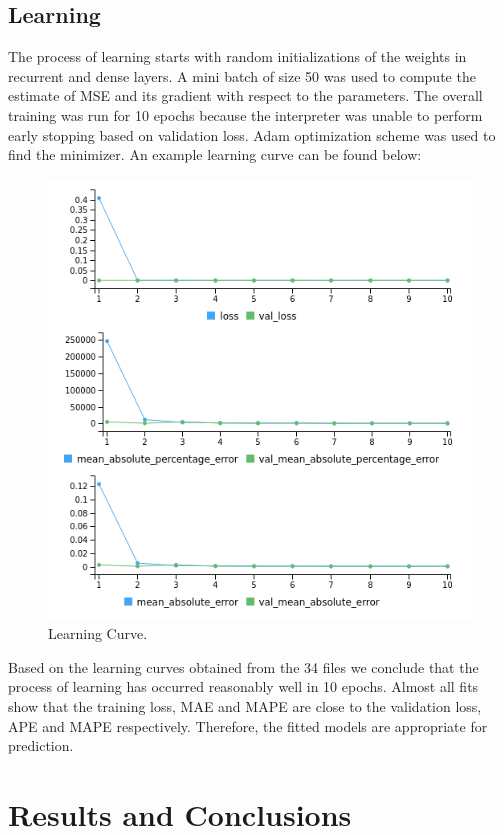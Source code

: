 \documentclass[%
aip,
amsmath,amssymb,
reprint,%
]{revtex4-1}
\begin{document}
\subsection{Learning}

The process of learning starts with random initializations of the weights in recurrent and dense layers. A mini batch of size 50 was used to compute the estimate of MSE and its gradient with respect to the parameters. The overall training was run for 10 epochs because the interpreter was unable to perform early stopping based on validation loss. Adam optimization scheme was used to find the minimizer. An example learning curve can be found below:

\begin{figure}[h!]
	\includegraphics[width=\linewidth]{learning.png}
	\caption{Learning Curve.}
	\label{fig:learning}
\end{figure}

Based on the learning curves obtained from the 34 files we conclude that the process of learning has occurred reasonably well in 10 epochs. Almost all fits show that the training loss, MAE and MAPE are close to the validation loss, APE and MAPE respectively. Therefore, the fitted models are appropriate for prediction.

\section{Results and Conclusions}
\end{document}
